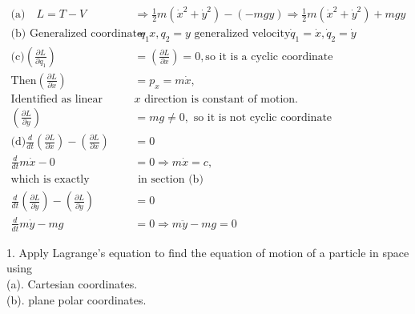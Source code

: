 \begin{answer}
\begin{align*}
\text{(a)} \quad L=T-V &\Rightarrow \frac{1}{2} m\left(\dot{x}^{2}+\dot{y}^{2}\right)-(-m g y) \Rightarrow \frac{1}{2} m\left(\dot{x}^{2}+\dot{y}^{2}\right)+m g y\\
\text{(b)} \text{ Generalized coordinate }q_{1}&=x, q_{2}=y\text{ generalized velocity} \dot{q}_{1}=\dot{x}, \dot{q}_{2}=\dot{y}\\
\text{(c)} \left(\frac{\partial L}{\partial q_{1}}\right)&=\left(\frac{\partial L}{\partial x}\right)=0, \text{so it is a cyclic coordinate}\\ 
\text{Then} \left(\frac{\partial L}{\partial \dot{x}}\right)&=p_{x}=m \dot{x},\\ \text{Identified as linear momentum in }&\text{$x$ direction is constant of motion.}\\
\left(\frac{\partial L}{\partial y}\right)&=m g \neq 0,\text{ so it is not cyclic coordinate}\\
\text{(d)} \frac{d}{d t}\left(\frac{\partial L}{\partial \dot{x}}\right)-\left(\frac{\partial L}{\partial x}\right)&=0 \\
\frac{d}{d t} m \dot{x}-0&=0 \Rightarrow m \dot{x}=c,\\
 \text{which is exactly explained} &\text{ in section (b)}\\
\frac{d}{d t}\left(\frac{\partial L}{\partial \dot{y}}\right)-\left(\frac{\partial L}{\partial y}\right)&=0 \\
 \frac{d}{d t} m \dot{y}-m g&=0 \Rightarrow m \ddot{y}-m g=0
\end{align*}
\end{answer}
\begin{exercise}
	1. Apply Lagrange's equation to find the equation of motion of a particle in space using \\
	(a). Cartesian coordinates. \\
	(b). plane polar coordinates.
\end{exercise}
